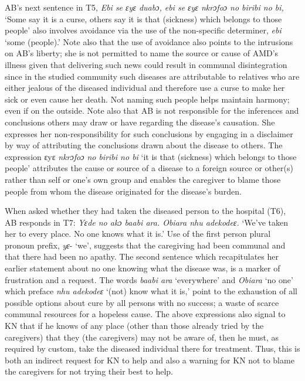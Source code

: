 \documentclass[output=paper,colorlinks,citecolor=brown]{langscibook}
\begin{document}
AB’s next sentence in T5, \textit{Ebi se ɛyɛ duabɔ, ebi se ɛyɛ nkrɔfoɔ no biribi no bi,} ‘Some say it is a curse, others say it is that (sickness) which belongs to those people’ also involves avoidance via the use of the non-specific determiner, \textit{ebi} ‘some (people).’ Note also that the use of avoidance also points to the intrusions on AB’s liberty; she is not permitted to name the source or cause of AMD’s illness given that delivering such news could result in communal disintegration since in the studied community such diseases are attributable to relatives who are either jealous of the diseased individual and therefore use a curse to make her sick or even cause her death. Not naming such people helps maintain harmony; even if on the outside. Note also that AB is not responsible for the inferences and conclusions others may draw or have regarding the disease’s causation. She expresses her non-responsibility for such conclusions by engaging in a disclaimer by way of attributing the conclusions drawn about the disease to others. The expression ɛyɛ \textit{nkrɔfoɔ no biribi no bi} ‘it is that (sickness) which belongs to those people’ attributes the cause or source of a disease to a foreign source or other(s) rather than self or one’s own group and enables the caregiver to blame those people from whom the disease originated for the disease’s burden.

When asked whether they had taken the diseased person to the hospital (T6), AB responds in T7:
\textit{Yɛde no akɔ baabi ara. Obiara nhu adekodeɛ.} ‘We’ve taken her to every place. No one knows what it is.’ Use of the first person plural pronoun prefix, \textit{yɛ}- ‘we’, suggests that the caregiving had been communal and that there had been no apathy. The second sentence which recapitulates her earlier statement about no one knowing what the disease was, is a marker of frustration and a request. The words \textit{baabi ara }‘everywhere’ and \textit{Obiara} ‘no one’ which preface \textit{nhu adekodeɛ} ‘(not) know what it is,’ point to the exhaustion of all possible options about cure by all persons with no success; a waste of scarce communal resources for a hopeless cause. The above expressions also signal to KN that if he knows of any place (other than those already tried by the caregivers) that they (the caregivers) may not be aware of, then he must, as required by custom, take the diseased individual there for treatment. Thus, this is both an indirect request for KN to help and also a warning for KN not to blame the caregivers for not trying their best to help.
\end{document}
